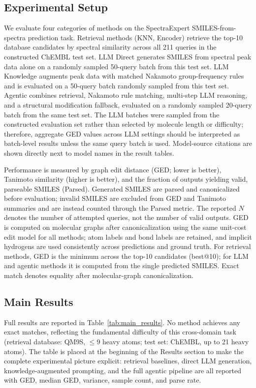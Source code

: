 \subsection{Experimental Setup}

We evaluate four categories of methods on the SpectraExpert SMILES-from-spectra prediction task. Retrieval methods (KNN, Encoder) retrieve the top-10 database candidates by spectral similarity across all 211 queries in the constructed ChEMBL test set. LLM Direct generates SMILES from spectral peak data alone on a randomly sampled 50-query batch from this test set. LLM Knowledge augments peak data with matched Nakamoto group-frequency rules and is evaluated on a 50-query batch randomly sampled from this test set. Agentic combines retrieval, Nakamoto rule matching, multi-step LLM reasoning, and a structural modification fallback, evaluated on a randomly sampled 20-query batch from the same test set. The LLM batches were sampled from the constructed evaluation set rather than selected by molecule length or difficulty; therefore, aggregate GED values across LLM settings should be interpreted as batch-level results unless the same query batch is used. Model-source citations are shown directly next to model names in the result tables.

Performance is measured by graph edit distance (GED; lower is better), Tanimoto similarity (higher is better), and the fraction of outputs yielding valid, parseable SMILES (Parsed). Generated SMILES are parsed and canonicalized before evaluation; invalid SMILES are excluded from GED and Tanimoto summaries and are instead counted through the Parsed metric. The reported $N$ denotes the number of attempted queries, not the number of valid outputs. GED is computed on molecular graphs after canonicalization using the same unit-cost edit model for all methods; atom labels and bond labels are retained, and implicit hydrogens are used consistently across predictions and ground truth. For retrieval methods, GED is the minimum across the top-10 candidates (best@10); for LLM and agentic methods it is computed from the single predicted SMILES. Exact match denotes equality after molecular-graph canonicalization.

\subsection{Main Results}

Full results are reported in Table~\ref{tab:main_results}. No method achieves any exact matches, reflecting the fundamental difficulty of this cross-domain task (retrieval database: QM9S, $\leq9$ heavy atoms; test set: ChEMBL, up to 21 heavy atoms). The table is placed at the beginning of the Results section to make the complete experimental picture explicit: retrieval baselines, direct LLM generation, knowledge-augmented prompting, and the full agentic pipeline are all reported with GED, median GED, variance, sample count, and parse rate.

